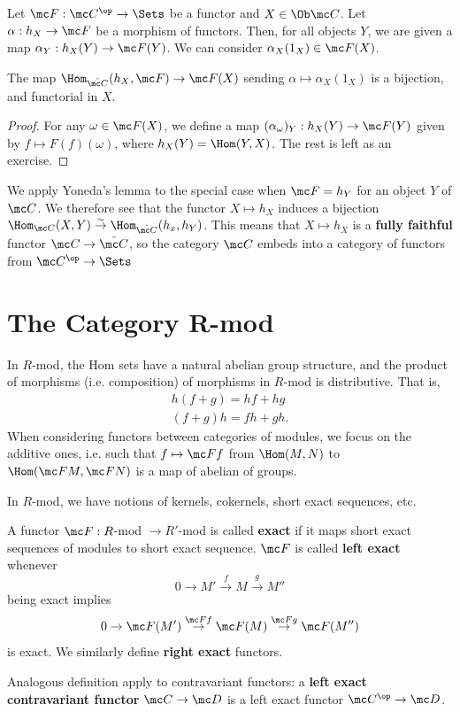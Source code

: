 Let $\mc F : \mc C^{\op} \to \Sets$ be a functor and $X \in \Ob \mc C$. Let $\alpha : h_X \to \mc F$ be a morphism of functors. Then, for all objects $Y$, we are given a map $\alpha _Y : h_X(Y) \to \mc F(Y)$. We can consider $\alpha_X(1_X) \in \mc F(X)$.

\begin{lem}
    The map $\Hom_{\hat{\mc C}}(h_X,\mc F) \to \mc F(X)$ sending $\alpha \mapsto \alpha_X(1_X)$ is a bijection, and functorial in $X$.
\end{lem}

\begin{proof}
    For any $\omega \in \mc F(X)$, we define a map $(\alpha_\omega)_Y:h_X(Y) \to \mc F(Y)$ given by $f \mapsto F(f)(\omega)$, where $h_X(Y) = \Hom(Y,X)$. The rest is left as an exercise.
\end{proof}

We apply Yoneda's lemma to the special case when $\mc F=h_Y$ for an object $Y$ of $\mc C$. We therefore see that the functor $X \mapsto h_X$ induces a bijection $\Hom_{\mc C}(X,Y) \overset{\sim}{\to}\Hom_{\hat {\mc C}}(h_x,h_Y)$. This means that $X \mapsto h_X$ is a \textbf{fully faithful} functor $\mc C \to \hat {\mc C}$, so the category $\mc C$ embeds into a category of functors from $\mc C^{\op} \to \Sets$

\section{The Category R-mod}

In $R$-mod, the Hom sets have a natural abelian group structure, and the product of morphisms (i.e. composition) of morphisms in $R$-mod is distributive. That is,
\begin{align*}
    h(f+g) = hf+hg
    \\ (f+g)h=fh+gh.
\end{align*}
When considering functors between categories of modules, we focus on the additive ones, i.e. such that $f \mapsto \mc Ff$ from $\Hom(M,N)$ to $\Hom(\mc FM, \mc FN)$ is a map of abelian of groups.

In $R$-mod, we have notions of kernels, cokernels, short exact sequences, etc.

\begin{defn}
    A functor $\mc F: R$-mod $\to R'$-mod is called \textbf{exact} if it maps short exact sequences of modules to short exact sequence. $\mc F$ is called \textbf{left exact} whenever
    $$0 \to M' \overset{f}{\to} M \overset{g}{\to}M''$$
    being exact implies
    $$0 \to \mc F(M') \overset{\mc Ff}{\to}\mc F(M) \overset{\mc Fg}{\to} \mc F(M'')$$
    is exact. We similarly define \textbf{right exact} functors.

    Analogous definition apply to contravariant functors: a \textbf{left exact contravariant functor} $\mc C \to \mc D$ is a left exact functor $\mc C^{\op} \to \mc D$.
\end{defn}

